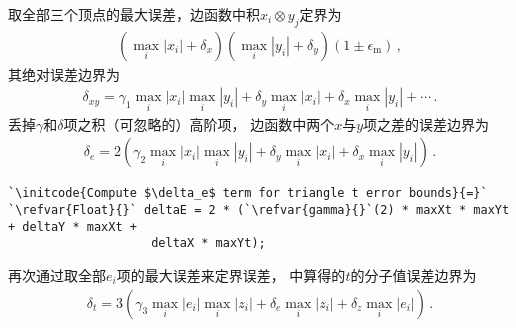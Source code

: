 取全部三个顶点的最大误差，边函数中积$x_i\otimes y_j$定界为
\begin{align*}
    (\max_i{|x_i|}+\delta_x)(\max_i{|y_i|}+\delta_y)(1\pm\epsilon_{\mathrm{m}})\, ,
\end{align*}
其绝对误差边界为
\begin{align*}
    \delta_{xy}=\gamma_1\max_i{|x_i|}\max_i{|y_i|}+\delta_y\max_i{|x_i|}+\delta_x\max_i{|y_i|}+\cdots\, .
\end{align*}
\pagebreak %
丢掉$\gamma$和$\delta$项之积（可忽略的）高阶项，
边函数中两个$x$与$y$项之差的误差边界为
\begin{align*}
    \delta_e=2(\gamma_2\max_i{|x_i|}\max_i{|y_i|}+\delta_y\max_i{|x_i|}+\delta_x\max_i{|y_i|})\, .
\end{align*}

\begin{lstlisting}
`\initcode{Compute $\delta_e$ term for triangle t error bounds}{=}`
`\refvar{Float}{}` deltaE = 2 * (`\refvar{gamma}{}`(2) * maxXt * maxYt + deltaY * maxXt +
                    deltaX * maxYt);
\end{lstlisting}

再次通过取全部$e_i$项的最大误差来定界误差，
中算得的$t$的分子值误差边界为
\begin{align*}
    \delta_t=3(\gamma_3\max\limits_i{|e_i|}\max\limits_i{|z_i|}+\delta_e\max\limits_i{|z_i|}+\delta_z\max\limits_i{|e_i|})\, .
\end{align*}

